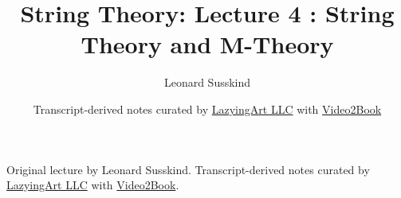 \documentclass[11pt,oneside]{book}
\begin{document}
\frontmatter
\title{String Theory: Lecture 4 : String Theory and M-Theory}
\author{Leonard Susskind}
\date{Transcript-derived notes curated by \href{https://lazying.art}{LazyingArt LLC} with \href{https://github.com/lachlanchen/Video2Book}{Video2Book}}
\maketitle
\begin{center}
\small Original lecture by Leonard Susskind. Transcript-derived notes curated by \href{https://lazying.art}{LazyingArt LLC} with \href{https://github.com/lachlanchen/Video2Book}{Video2Book}.
\end{center}
\clearpage
\mainmatter

\end{document}
